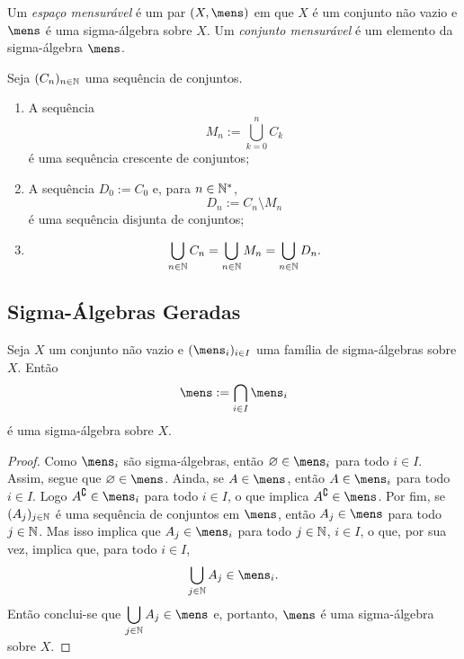 \begin{defi}
	Um \emph{espaço mensurável} é um par $(X,\mens)$ em que $X$ é um conjunto não vazio e $\mens$ é uma sigma-álgebra sobre $X$. Um \emph{conjunto mensurável} é um elemento da sigma-álgebra $\mens$.
\end{defi}

\begin{prop}
Seja $(C_n)_{n \in \mathbb{N}}$ uma sequência de conjuntos.
	\begin{enumerate}
	\item A sequência
	\begin{equation*}
	M_n := \bigcup_{k=0}^n C_k
	\end{equation*}
é uma sequência crescente de conjuntos;
	\item A sequência $D_0 := C_0$ e, para $n \in \mathbb{N}^*$,
	\begin{equation*}
	D_n := C_n \setminus M_n
	\end{equation*}
é uma sequência disjunta de conjuntos;
	\item	
	\begin{equation*}
	\bigcup_{n \in \mathbb{N}} C_n = \bigcup_{n \in \mathbb{N}} M_n = \bigcup_{n \in \mathbb{N}} D_n.
	\end{equation*}
	\end{enumerate}
\end{prop}

\subsection{Sigma-Álgebras Geradas}

\begin{prop}
Seja $X$ um conjunto não vazio e $(\mens_i)_{i \in I}$ uma família de sigma-álgebras sobre $X$. Então
	\begin{equation*}
	\mens := \bigcap_{i \in I} \mens_i
	\end{equation*}
é uma sigma-álgebra sobre $X$.
\end{prop}
\begin{proof}
	Como $\mens_i$ são sigma-álgebras, então $\emptyset \in \mens_i$ para todo $i \in I$. Assim, segue que $\emptyset \in \mens$. Ainda, se $A \in \mens$, então $A \in \mens_i$ para todo $i \in I$. Logo $A^\complement \in \mens_i$ para todo $i \in I$, o que implica $A^\complement \in \mens$. Por fim, se $(A_j)_{j \in \mathbb{N}}$ é uma sequência de conjuntos em $\mens$, então $A_j \in \mens$ para todo $j \in \mathbb{N}$. Mas isso implica que $A_j \in \mens_i$ para todo $j \in \mathbb{N}$, $i \in I$, o que, por sua vez, implica que, para todo $i \in I$,
	\begin{equation*}
	\bigcup_{j \in \N} A_j \in \mens_i.
	\end{equation*}
Então conclui-se que $\displaystyle\bigcup_{j \in \N} A_j \in \mens$ e, portanto, $\mens$ é uma sigma-álgebra sobre $X$.
\end{proof}


